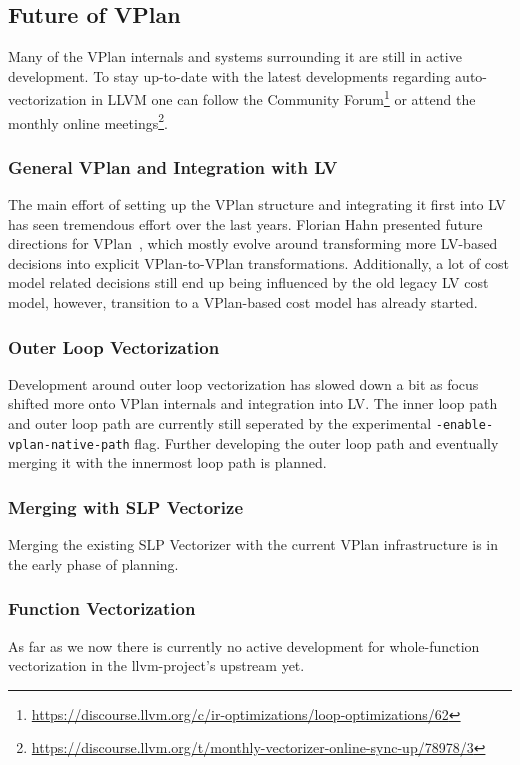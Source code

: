 \documentclass[sigplan,11pt,nonacm]{acmart}
\begin{document}
\subsection{Future of VPlan}
Many of the VPlan internals and systems surrounding it are still in active development. To stay
up-to-date with the latest developments regarding auto-vectorization in LLVM one can follow the 
Community Forum\footnote{\url{https://discourse.llvm.org/c/ir-optimizations/loop-optimizations/62}} or
attend the monthly online 
meetings\footnote{\url{https://discourse.llvm.org/t/monthly-vectorizer-online-sync-up/78978/3}}.

\subsubsection{General VPlan and Integration with LV}
The main effort of setting up the VPlan structure and integrating it first into LV has seen
tremendous effort over the last years. Florian Hahn presented future directions for 
VPlan~\cite{llvmvplanupdate}, which mostly evolve around transforming more LV-based decisions into
explicit VPlan-to-VPlan transformations. Additionally, a lot of cost model related decisions 
still end up being influenced by the old legacy LV cost model, however, transition to a VPlan-based 
cost model has already started.

\subsubsection{Outer Loop Vectorization}
Development around outer loop vectorization has slowed down a bit as focus shifted more onto VPlan
internals and integration into LV. The inner loop path and outer loop path are currently still
seperated by the experimental \texttt{-enable-vplan-native-path} flag. Further developing the 
outer loop path and eventually merging it with the innermost loop path is planned.

\subsubsection{Merging with SLP Vectorize}
Merging the existing SLP Vectorizer with the current VPlan infrastructure is in the early phase
of planning.

\subsubsection{Function Vectorization}
As far as we now there is currently no active development for whole-function vectorization in the
llvm-project's upstream yet.
\end{document}
